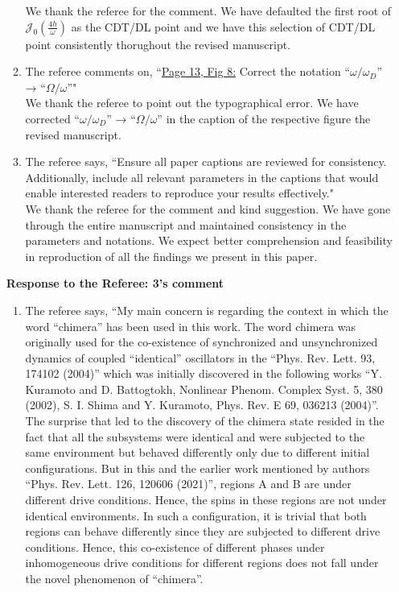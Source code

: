 \documentclass[aps,prb,reprint,showpacs,floatfix,superscriptaddress, onecolumn, nofootinbib, 10pt]{revtex4-2}
\newcommand{\response}[1]{{\color{black}#1}} %
\newcommand{\comment}[1]{{\color{blue}#1}} %
\begin{document}
\begin{enumerate}
\begin{enumerate}
		\response{We thank the referee for the comment. We have defaulted the first root of $\mathcal{J}_0\left(\frac{4h}{\omega}\right)$ as the CDT/DL point and we have this selection of CDT/DL point consistently thorughout the revised manuscript.}\\
		
		\item The referee comments on, \comment{``\underline{Page 13, Fig 8:} Correct the notation “$\omega/\omega_D$” → “$\Omega/\omega$”"}\\
		
		\response{We thank the referee to point out the typographical error. We have corrected “$\omega/\omega_D$” → “$\Omega/\omega$” in the caption of the respective figure the revised manuscript.}\\
		\item The referee says, \comment{``Ensure all paper captions are reviewed for consistency. Additionally, include all relevant
			parameters in the captions that would enable interested readers to reproduce your
			results effectively."}\\
		
		\response{We thank the referee for the comment and kind suggestion. We have gone through the entire manuscript and maintained consistency in the parameters and notations. We expect  better comprehension and feasibility in reproduction of all the findings we present in this paper.}
	\end{enumerate}

	\newpage
	\noindent \textbf{Response to the Referee: 3's comment}
	\begin{enumerate}
		\item The referee says, \comment{``My main concern is regarding the context in which the word “chimera” has been used
			in this work. The word chimera was originally used for the co-existence of synchronized and unsynchronized dynamics of coupled “identical” oscillators in the “Phys. Rev. Lett. 93, 174102 (2004)” which was initially discovered in the following
			works “Y. Kuramoto and D. Battogtokh, Nonlinear Phenom. Complex Syst. 5, 380 (2002), S. I. Shima and Y. Kuramoto, Phys. Rev. E 69, 036213 (2004)”. The surprise that led to the discovery of the chimera state resided in the fact that all the
			subsystems were identical and were subjected to the same environment but behaved differently only due to different initial configurations. But in this and the earlier work mentioned by authors “Phys. Rev. Lett. 126, 120606 (2021)”, regions A and B are under different drive conditions. Hence, the spins in these regions are not under identical environments. In such a configuration, it is trivial that both regions can behave differently since they are subjected to different drive conditions. Hence, this co-existence of different phases under inhomogeneous drive conditions for different
			regions does not fall under the novel phenomenon of “chimera”.\\
			
}
\end{enumerate}
\end{enumerate}
\end{document}
